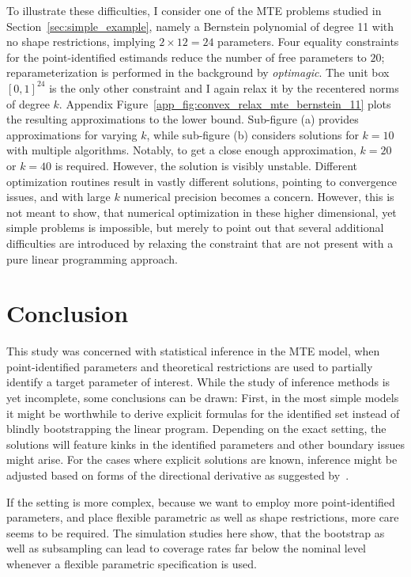 \documentclass[12pt,a4paper,english]{article} %
\numberwithin{equation}{section}
\theoremstyle{definition}
\theoremstyle{remark}
\theoremstyle{plain}
\begin{document}
To illustrate these difficulties, I consider one of the MTE problems studied in Section~\ref{sec:simple_example}, namely a Bernstein polynomial of degree 11 with no shape restrictions, implying $2\times12=24$ parameters.
Four equality constraints for the point-identified estimands reduce the number of free parameters to $20$; reparameterization is performed in the background by \textit{optimagic}.
The unit box $[0,1]^{24}$ is the only other constraint and I again relax it by the recentered norms of degree $k$.
Appendix Figure~\ref{app_fig:convex_relax_mte_bernstein_11} plots the resulting approximations to the lower bound.
Sub-figure (a) provides approximations for varying $k$, while sub-figure (b) considers solutions for $k=10$ with multiple algorithms.
Notably, to get a close enough approximation, $k=20$ or $k=40$ is required. However, the solution is visibly unstable.
Different optimization routines result in vastly different solutions, pointing to convergence issues, and with large $k$ numerical precision becomes a concern.
However, this is not meant to show, that numerical optimization in these higher dimensional, yet simple problems is impossible, but merely to point out that several additional difficulties are introduced by relaxing the constraint that are not present with a pure linear programming approach.


\section{Conclusion}
This study was concerned with statistical inference in the MTE model, when point-identified parameters and theoretical restrictions are used to partially identify a target parameter of interest.
While the study of inference methods is yet incomplete, some conclusions can be drawn:
First, in the most simple models it might be worthwhile to derive explicit formulas for the identified set instead of blindly bootstrapping the linear program.
Depending on the exact setting, the solutions will feature kinks in the identified parameters and other boundary issues might arise.
For the cases where explicit solutions are known, inference might be adjusted based on forms of the directional derivative as suggested by~\citep{fang2019infdirdiff}.

If the setting is more complex, because we want to employ more point-identified parameters, and place flexible parametric as well as shape restrictions, more care seems to be required.
The simulation studies here show, that the bootstrap as well as subsampling can lead to coverage rates far below the nominal level whenever a flexible parametric specification is used.
\end{document}
